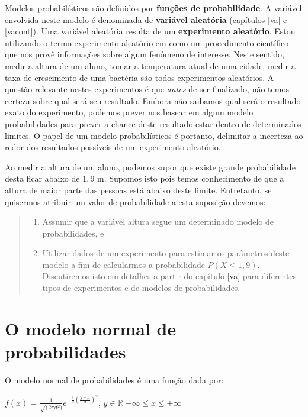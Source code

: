 \documentclass[
]{book}
\providecommand{\tightlist}{%
  \setlength{\itemsep}{0pt}\setlength{\parskip}{0pt}}
\begin{document}
Modelos probabilísticos são definidos por \textbf{funções de probabilidade}. A variável envolvida neste modelo é denominada de \textbf{variável aleatória} (capítulos \ref{va} e \ref{vacont}). Uma variável aleatória resulta de um \textbf{experimento aleatório}. Estou utilizando o termo experimento aleatório em como um procedimento científico que nos provê informações sobre algum fenômeno de interesse. Neste sentido, medir a altura de um aluno, tomar a temperatura atual de uma cidade, medir a taxa de crescimento de uma bactéria são todos experimentos aleatórios. A questão relevante nestes experimentos é que \emph{antes} de ser finalizado, não temos certeza sobre qual será seu resultado. Embora não saibamos qual será o resultado exato do experimento, podemos prever nos basear em algum modelo probabilidades para prever a chance deste resultado estar dentro de determinados limites. O papel de um modelo probabilísticos é portanto, delimitar a incerteza ao redor dos resultados possíveis de um experimento aleatório.

Ao medir a altura de um aluno, podemos supor que existe grande probabilidade desta ficar abaixo de \(1,9\) m. Supomos isto pois temos conhecimento de que a altura de maior parte das pessoas está abaixo deste limite. Entretanto, se quisermos atribuir um valor de probabilidade a esta suposição devemos:

\begin{quote}
\begin{enumerate}
\def\labelenumi{\arabic{enumi}.}
\tightlist
\item
  Assumir que a variável altura segue um determinado modelo de probabilidades, e
\item
  Utilizar dados de um experimento para estimar os parâmetros deste modelo a fim de calcularmos a probabilidade \(P(X \le 1,9)\). Discutiremos isto em detalhes a partir do capítulo \ref{va} para diferentes tipos de experimentos e de modelos de probabilidades.
\end{enumerate}
\end{quote}

\hypertarget{o-modelo-normal-de-probabilidades}{%
\section{O modelo normal de probabilidades}\label{o-modelo-normal-de-probabilidades}}

O modelo normal de probabilidades é uma função dada por:

\(f(x) = \frac{1}{\sqrt(2\pi\sigma^2)}e^{-\frac{1}{2}(\frac{y-\mu}{\sigma})^2}\), \(y \in \mathbb{R} | -\infty \le x \le +\infty\)
\end{document}

